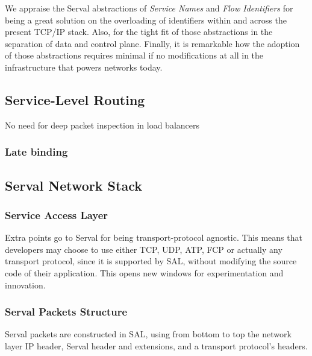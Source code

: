We appraise the Serval abstractions of \emph{Service Names} and \emph{Flow Identifiers} for being a great solution on the overloading of identifiers within and across the present TCP/IP stack.
Also, for the tight fit of those abstractions in the separation of data and control plane.
Finally, it is remarkable how the adoption of those abstractions requires minimal if no modifications at all in the infrastructure that powers networks today.





\newpage
\subsection{Service-Level Routing} 
No need for deep packet inspection in load balancers



\subsubsection{Late binding}







\newpage
\subsection{Serval Network Stack}



\subsubsection{Service Access Layer}
Extra points go to Serval for being transport-protocol agnostic.
This means that developers may choose to use either TCP, UDP, ATP, FCP or actually any transport protocol, since it is supported by SAL, without modifying the source code of their application.
This opens new windows for experimentation and innovation.



\subsubsection{Serval Packets Structure}
Serval packets are constructed in SAL, using from bottom to top the network layer IP header, Serval header and extensions, and a transport protocol's headers.

